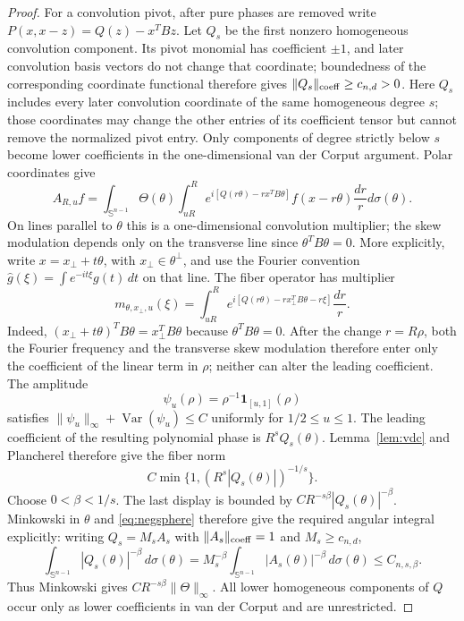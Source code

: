 \documentclass[11pt]{article}
\numberwithin{equation}{section}
\theoremstyle{remark}
\theoremstyle{definition}
\newcommand{\Sph}{\mathbb S}
\newcommand{\Var}{\operatorname{Var}}
\newcommand{\norm}[1]{\lVert #1\rVert}
\begin{document}
\begin{proof}
For a convolution pivot, after pure phases are removed write
$P(x,x-z)=Q(z)-x^TBz$.  Let $Q_s$ be the first nonzero homogeneous
convolution component.  Its pivot monomial has coefficient $\pm1$, and
later convolution basis vectors do not change that coordinate; boundedness
of the corresponding coordinate functional therefore gives
$\norm{Q_s}_{\rm coeff}\ge c_{n,d}>0$.  Here $Q_s$ includes every later
convolution coordinate of the same homogeneous degree $s$; those
coordinates may change the other entries of its coefficient tensor but
cannot remove the normalized pivot entry.  Only components of degree
strictly below $s$ become lower coefficients in the one-dimensional
van der Corput argument.  Polar
coordinates give
\[
 A_{R,u}f=\int_{\Sph^{n-1}}\Theta(\theta)
 \int_{uR}^R e^{i[Q(r\theta)-rx^TB\theta]}f(x-r\theta)\frac{dr}{r}
 d\sigma(\theta).
\]
On lines parallel to $\theta$ this is a one-dimensional convolution
multiplier; the skew modulation depends only on the transverse line since
$\theta^TB\theta=0$.  More explicitly, write
$x=x_\perp+t\theta$, with $x_\perp\in\theta^\perp$, and use the Fourier
convention $\widehat g(\xi)=\int e^{-it\xi}g(t)\,dt$ on that line.  The
fiber operator has multiplier
\begin{equation}\label{eq:convolution-fiber-multiplier}
 m_{\theta,x_\perp,u}(\xi)
 =\int_{uR}^{R}
  e^{i[Q(r\theta)-r x_\perp^TB\theta-r\xi]}
  \frac{dr}{r}.
\end{equation}
Indeed, $(x_\perp+t\theta)^TB\theta=x_\perp^TB\theta$ because
$\theta^TB\theta=0$.  After the change $r=R\rho$, both the Fourier
frequency and the transverse skew modulation therefore enter only the
coefficient of the linear term in $\rho$; neither can alter the leading
coefficient.  The
amplitude
\[
 \psi_u(\rho)=\rho^{-1}\mathbf1_{[u,1]}(\rho)
\]
satisfies $\norm{\psi_u}_\infty+\Var(\psi_u)\le C$ uniformly for
$1/2\le u\le1$.  The leading coefficient of the resulting polynomial
phase is $R^sQ_s(\theta)$.  Lemma~\ref{lem:vdc} and Plancherel therefore
give the fiber norm
\[
 C\min\{1,(R^s|Q_s(\theta)|)^{-1/s}\}.
\]
Choose $0<\beta<1/s$.  The last display is bounded by
$CR^{-s\beta}|Q_s(\theta)|^{-\beta}$.  Minkowski in $\theta$ and
\eqref{eq:negsphere} therefore give the required angular integral
explicitly: writing $Q_s=M_sA_s$ with $\norm{A_s}_{\rm coeff}=1$ and
$M_s\ge c_{n,d}$,
\[
 \int_{\Sph^{n-1}}|Q_s(\theta)|^{-\beta}\,d\sigma(\theta)
 =M_s^{-\beta}\int_{\Sph^{n-1}}|A_s(\theta)|^{-\beta}\,d\sigma(\theta)
 \le C_{n,s,\beta}.
\]
Thus Minkowski gives
$CR^{-s\beta}\norm\Theta_\infty$.  All lower homogeneous components of
$Q$ occur only as lower coefficients in van der Corput and are unrestricted.


\end{proof}
\end{document}
